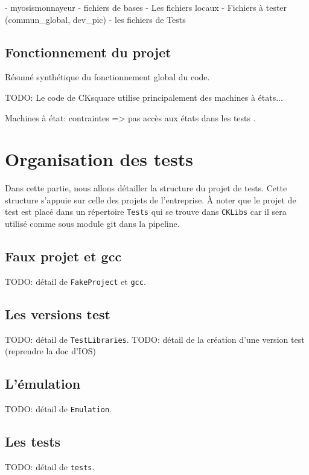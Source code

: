 \documentclass[a4paper]{article}
\begin{document}
- myosismonnayeur
- fichiers de bases
  - Les fichiers locaux
  - Fichiers à tester (commun\_global, dev\_pic)
- les fichiers de Tests

\subsection{Fonctionnement du projet}

Résumé synthétique du fonctionnement global du code.

TODO: Le code de CKsquare utilise principalement des machines à états...

Machines à état: contraintes => pas accès aux états dans les tests
\cite{teststatemachines}.

\section{Organisation des tests}

Dans cette partie, nous allons détailler la structure du projet de tests. Cette
structure s'appuie sur celle des projets de l'entreprise. À noter que le projet
de test est placé dans un répertoire \lstinline{Tests} qui se trouve dans
\lstinline{CKLibs} car il sera utilisé comme sous module git dans la pipeline.

\subsection{Faux projet et gcc}

TODO: détail de \lstinline{FakeProject} et \lstinline{gcc}.

\subsection{Les versions test}

TODO: détail de \lstinline{TestLibraries}.
TODO: détail de la création d'une version test (reprendre la doc d'IOS)

\subsection{L'émulation}

TODO: détail de \lstinline{Emulation}.

\subsection{Les tests}

TODO: détail de \lstinline{tests}.
\end{document}
